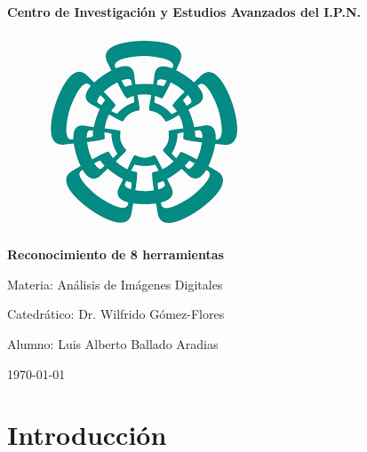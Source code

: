 \documentclass[a4paper, 11pt]{article}
\renewcommand\lstlistlistingname{Códigos}
\begin{document}

\begin{titlepage}
  \clearpage\thispagestyle{empty}
  \centering
  \vspace{1cm}
  {\Huge \textbf{Centro de Investigación y Estudios Avanzados del I.P.N.} \par}
  \vspace{1cm}

  \begin{figure}[h!]
    \centering
    \includegraphics[scale=0.5]{cinves.png}
  \end{figure}
    
  \vspace{1cm}
  {\Huge \textbf{Reconocimiento de 8 herramientas}\par} 
  \vspace{4cm}
  {\Large Materia: Análisis de Imágenes Digitales \par} 
  \vspace{3cm}
  {\Large Catedrático: Dr. Wilfrido Gómez-Flores \par} 
  \vspace{1cm}
  {\Large Alumno: Luis Alberto Ballado Aradias \par} 
  
  \vspace{3cm}
  {\normalsize \today \par}
\end{titlepage}

\tableofcontents{}

\pagebreak


\pagebreak
\section{Introducción}
\end{document}
